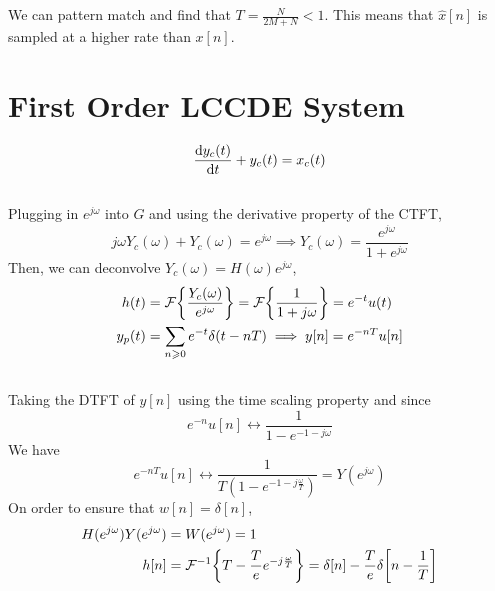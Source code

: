 \documentclass{article}
\begin{document}
\subsection{}

We can pattern match and find that \(T = \frac{N}{2M + N} < 1\).
This means that \(\hat{x}[n]\) is sampled at a higher rate than \(x[n]\).

\section{First Order LCCDE System}

\begin{equation}
    \dv{y_c(t)}{t} + y_c(t) = x_c(t)
\end{equation}

\subsection{}

Plugging in \(e^{j \omega}\) into \(G\) and using the derivative property of the CTFT,
\begin{equation}
    j \omega Y_c(\omega) + Y_c(\omega) = e^{j \omega} \implies Y_c(\omega) = \frac{e^{j \omega}}{1 + e^{j \omega}}
\end{equation}
Then, we can deconvolve \(Y_c(\omega) = H(\omega) e^{j \omega}\),
\begin{align}
    h(t) &= \mathcal{F}\qty{\frac{Y_c(\omega)}{e^{j \omega}}} = \mathcal{F}\qty{\frac{1}{1 + j \omega}} = e^{-t} u(t) \\
    y_p(t) &= \sum_{n \geqslant 0} e^{-t} \delta(t - nT) \implies y[n] = e^{-nT} u[n]
\end{align}

\subsection{}

Taking the DTFT of \(y[n]\) using the time scaling property and since
\begin{equation}
    e^{-n} u[n] \longleftrightarrow \frac{1}{1 - e^{-1 - j \omega}}
\end{equation}
We have
\begin{equation}
    e^{-nT} u[n] \longleftrightarrow \frac{1}{T (1 - e^{-1 - j \frac{\omega}{T}})} = Y(e^{j \omega})
\end{equation}
On order to ensure that \(w[n] = \delta[n]\),
\begin{align}
    H(e^{j \omega}) Y(e^{j \omega}) &= W(e^{j \omega}) = 1 \\
    h[n] &= \mathcal{F}^{-1}\qty{T - \frac{T}{e}e^{-j \frac{\omega}{T}}} = \delta[n] - \frac{T}{e} \delta\qty[n - \frac{1}{T}]
\end{align}
\end{document}
